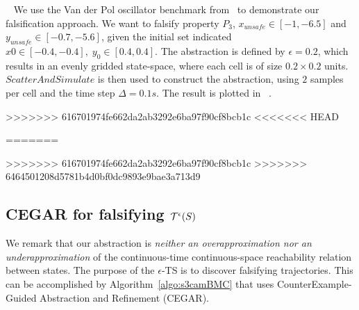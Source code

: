 \begin{example}~\label{ex:vdp}
We use the Van der Pol oscillator benchmark
from~\cite{zutshi2014multiple} to demonstrate our falsification
approach. We want to falsify property $P_3$, $x_{unsafe}\in[-1,
-6.5]$ and $y_{unsafe}\in[-0.7, -5.6]$, given the initial set
indicated $x0\in[-0.4, -0.4],\; y_0\in[0.4, 0.4]$. The abstraction
is defined by $\epsilon=0.2$, which results in an evenly gridded
state-space, where each cell is of size $0.2 \times 0.2$ units.
$ScatterAndSimulate$ is then used to construct the abstraction,
using $2$ samples per cell and the time step $\Delta = 0.1s$. The
result is plotted in ~.

>>>>>>> 616701974fe662da2ab3292e6ba97f90cf8bcb1c
<<<<<<< HEAD
        

=======
\end{example}
>>>>>>> 616701974fe662da2ab3292e6ba97f90cf8bcb1c
>>>>>>> 6464501208d5781b4d0bf0dc9893e9bae3a713d9

\subsection{CEGAR for falsifying $\mathcal{T}^{\epsilon}(S)$}

We remark that our abstraction is {\em neither an overapproximation
nor an underapproximation} of the continuous-time continuous-space
reachability relation between states. The purpose of the $\epsilon$-TS
is to discover falsifying trajectories. This can be accomplished by
Algorithm~\ref{algo:s3camBMC} that uses CounterExample-Guided
Abstraction and Refinement (CEGAR).

